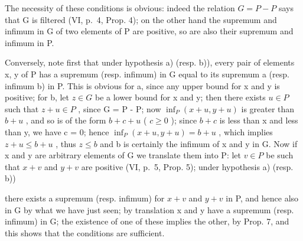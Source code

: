 The necessity of these conditions is obvious: indeed the relation \(G = P - P\) says that G is filtered (VI, p.~4, Prop. 4); on the other hand the supremum and infimum in G of two elements of P are positive, so are also their supremum and infimum in P.

Conversely, note first that under hypothesis a) (resp. b)), every pair of elements x, y of P has a supremum (resp. infimum) in G equal to its supremum a (resp. infimum b) in P. This is obvious for a, since any upper bound for x and y is positive; for b, let \(z \in G\) be a lower bound for x and y; then there exists \(u \in P\) such that \(z + u \in P\) , since G = P - P; now \(\inf_{P}(x + u, y + u)\) is greater than \(b + u\) , and so is of the form \(b + c + u\) ( \(c \geqslant 0\) ); since \(b + c\) is less than x and less than y, we have c = 0; hence \(\inf_{P}(x + u, y + u) = b + u\) , which implies \(z + u \leqslant b + u\) , thus \(z \leqslant b\) and b is certainly the infimum of x and y in G. Now if x and y are arbitrary elements of G we translate them into P: let \(v \in P\) be such that \(x + v\) and \(y + v\) are positive (VI, p.~5, Prop. 5); under hypothesis a) (resp. b))

there exists a supremum (resp. infimum) for \(x + v\) and \(y + v\) in P, and hence also in G by what we have just seen; by translation x and y have a supremum (resp. infimum) in G; the existence of one of these implies the other, by Prop. 7, and this shows that the conditions are sufficient.

